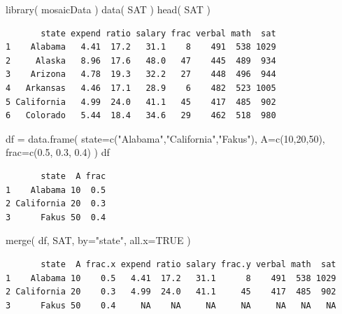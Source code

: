 \documentclass[
  letterpaper,
  DIV=11,
  numbers=noendperiod]{scrreprt}
\newenvironment{Shaded}{\begin{snugshade}}{\end{snugshade}}
\newcommand{\AttributeTok}[1]{\textcolor[rgb]{0.49,0.56,0.16}{#1}}
\newcommand{\ConstantTok}[1]{\textcolor[rgb]{0.53,0.00,0.00}{#1}}
\newcommand{\DecValTok}[1]{\textcolor[rgb]{0.25,0.63,0.44}{#1}}
\newcommand{\FloatTok}[1]{\textcolor[rgb]{0.25,0.63,0.44}{#1}}
\newcommand{\FunctionTok}[1]{\textcolor[rgb]{0.02,0.16,0.49}{#1}}
\newcommand{\NormalTok}[1]{\textcolor[rgb]{0.00,0.44,0.13}{#1}}
\newcommand{\OtherTok}[1]{\textcolor[rgb]{0.00,0.44,0.13}{#1}}
\newcommand{\StringTok}[1]{\textcolor[rgb]{0.25,0.44,0.63}{#1}}
\begin{document}
\begin{Shaded}
\begin{Highlighting}[]
\FunctionTok{library}\NormalTok{( mosaicData )}
\FunctionTok{data}\NormalTok{( SAT )}
\FunctionTok{head}\NormalTok{( SAT )}
\end{Highlighting}
\end{Shaded}

\begin{verbatim}
       state expend ratio salary frac verbal math  sat
1    Alabama   4.41  17.2   31.1    8    491  538 1029
2     Alaska   8.96  17.6   48.0   47    445  489  934
3    Arizona   4.78  19.3   32.2   27    448  496  944
4   Arkansas   4.46  17.1   28.9    6    482  523 1005
5 California   4.99  24.0   41.1   45    417  485  902
6   Colorado   5.44  18.4   34.6   29    462  518  980
\end{verbatim}

\begin{Shaded}
\begin{Highlighting}[]
\NormalTok{df }\OtherTok{=} \FunctionTok{data.frame}\NormalTok{( }\AttributeTok{state=}\FunctionTok{c}\NormalTok{(}\StringTok{"Alabama"}\NormalTok{,}\StringTok{"California"}\NormalTok{,}\StringTok{"Fakus"}\NormalTok{), }
                \AttributeTok{A=}\FunctionTok{c}\NormalTok{(}\DecValTok{10}\NormalTok{,}\DecValTok{20}\NormalTok{,}\DecValTok{50}\NormalTok{), }
                \AttributeTok{frac=}\FunctionTok{c}\NormalTok{(}\FloatTok{0.5}\NormalTok{, }\FloatTok{0.3}\NormalTok{, }\FloatTok{0.4}\NormalTok{) )}
\NormalTok{df}
\end{Highlighting}
\end{Shaded}

\begin{verbatim}
       state  A frac
1    Alabama 10  0.5
2 California 20  0.3
3      Fakus 50  0.4
\end{verbatim}

\begin{Shaded}
\begin{Highlighting}[]
\FunctionTok{merge}\NormalTok{( df, SAT, }\AttributeTok{by=}\StringTok{"state"}\NormalTok{, }\AttributeTok{all.x=}\ConstantTok{TRUE}\NormalTok{ )}
\end{Highlighting}
\end{Shaded}

\begin{verbatim}
       state  A frac.x expend ratio salary frac.y verbal math  sat
1    Alabama 10    0.5   4.41  17.2   31.1      8    491  538 1029
2 California 20    0.3   4.99  24.0   41.1     45    417  485  902
3      Fakus 50    0.4     NA    NA     NA     NA     NA   NA   NA
\end{verbatim}
\end{document}
